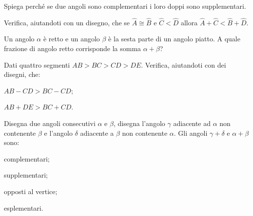 \begin{esercizio}
\label{ese:1.79}
Spiega perché se due angoli sono complementari i loro doppi sono supplementari.
\end{esercizio}

\begin{esercizio}
\label{ese:1.80}
Verifica, aiutandoti con un disegno, che se $\widehat{A}\cong \widehat{B}$ e $\widehat{C}<\widehat{D}$ allora $\widehat{A}+\widehat{C}<\widehat{B}+\widehat{D}$.
\end{esercizio}

\begin{esercizio}
\label{ese:1.81}
Un angolo $\alpha$ è retto e un angolo $\beta$ è la sesta parte di un angolo piatto. A quale frazione di angolo retto corrisponde la somma $\alpha + \beta$?
\end{esercizio}

\begin{esercizio}
\label{ese:1.82}
Dati quattro segmenti $AB>BC>CD>DE$. Verifica, aiutandoti con dei disegni, che:
\begin{enumeratea}
\item $AB-CD > BC-CD$;
\item $AB+DE > BC+CD$.
\end{enumeratea}
\end{esercizio}

\begin{esercizio}
\label{ese:1.83}
Disegna due angoli consecutivi $\alpha$ e $\beta$, disegna l'angolo $\gamma$ adiacente ad $\alpha$ non contenente $\beta$ e l'angolo $\delta$ adiacente a $\beta$ non contenente $\alpha$. Gli angoli $\gamma + \delta$ e $\alpha+\beta$ sono:
\begin{multicols}{2}
\begin{enumeratea}
\item complementari;
\item supplementari;
\item opposti al vertice;
\item esplementari.
\end{enumeratea}
\end{multicols}
\end{esercizio}

